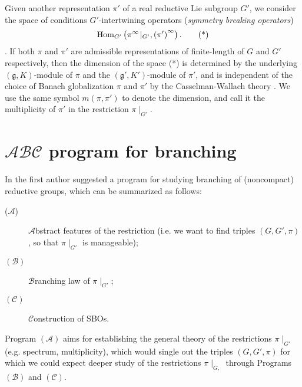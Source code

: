 \documentclass[reqno,12pt]{pja00} %
\newcommand{\Hom}{\mbox{\normalfont Hom}}
\theoremstyle{definition}
\theoremstyle{exampstyle} \newtheorem{examp}[theorem]{Theorem}
\begin{document}
Given another representation $\pi'$ of a real reductive Lie subgroup $G'$, we consider the space of conditions $G'$-intertwining operators ({\it symmetry breaking operators})
\begin{equation*}
	\Hom_{G'}\left( \pi^\infty\!\mid_{G'}, \left( \pi' \right)^\infty\right).\tag{*}
\end{equation*}.
If both $\pi$ and $\pi'$ are admissible representations of finite-length of $G$ and $G'$ respectively, then the dimension of the space (*) is determined by the underlying
$(\mathfrak{g},K)$-module of $\pi$ and the $(\mathfrak{g}',K')$-module of $\pi'$, and is independent of the choice of Banach globalization $\pi$ and $\pi'$ by the Casselman-Wallach theory
\cite{wallach1988real2}. We use the same symbol $m(\pi,\pi')$ to denote the dimension, and call it the multiplicity of $\pi'$ in the restriction $\pi\!\mid_{G'}$.

\section{$\mathcal{A}\mathcal{B}\mathcal{C}$ program for branching}

In {\cite{kobayashi2015program}} the first author suggested a program
for studying branching of (noncompact) reductive groups, which can be summarized
as follows:
\begin{description}
  \item[($\mathcal{A}$)] $\mathcal{A}$bstract features of the restriction
  (i.e. we want to find triples $(G, G', \pi)$, so that $\pi\!\mid_{G'}$ is
  manageable);
  
  \item[$(\mathcal{B})$] $\mathcal{B}$ranching law of $\pi\!\mid_{G'}$;
  
  \item[$(\mathcal{C})$] $\mathcal{C}$onstruction of SBOs.
\end{description}
Program $\left( \mathcal{A} \right)$ aims for establishing the general theory of the restrictions $\pi\!\mid_{G'}$
(e.g. spectrum, multiplicity), which would single out the triples $\left( G,G',\pi \right)$ for which we could expect deeper study of the restrictions
$\pi\!\mid_{G,}$ through Programs $\left( \mathcal{B} \right)$ and $\left( \mathcal{C} \right)$.
\end{document}
